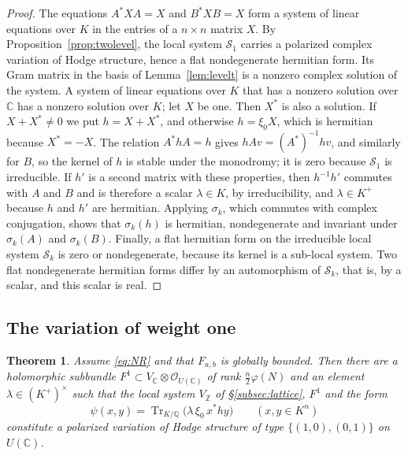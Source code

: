 \documentclass[11pt]{amsart}
\newtheorem{theorem}{Theorem}[section]
\theoremstyle{definition}
\theoremstyle{remark}
\numberwithin{equation}{section}
\newcommand{\Q}{\mathbb{Q}}
\newcommand{\Z}{\mathbb{Z}}
\newcommand{\C}{\mathbb{C}}
\newcommand{\cS}{\mathcal{S}}
\newcommand{\cO}{\mathcal{O}}
\DeclareMathOperator{\Tr}{Tr}
\newcommand{\Fab}{F_{a,b}}
\begin{document}
\begin{proof}
The equations $A^*XA=X$ and $B^*XB=X$ form a system of linear equations over $K$ in the entries of a $n\times n$ matrix $X$. By Proposition~\ref{prop:twolevel}, the local system $\cS_1$ carries a polarized complex variation of Hodge structure, hence a flat nondegenerate hermitian form. Its Gram matrix in the basis of Lemma~\ref{lem:levelt} is a nonzero complex solution of the system. A system of linear equations over $K$ that has a nonzero solution over $\C$ has a nonzero solution over $K$; let $X$ be one. Then $X^*$ is also a solution. If $X+X^*\ne0$ we put $h=X+X^*$, and otherwise $h=\xi_0X$, which is hermitian because $X^*=-X$. The relation $A^*hA=h$ gives $hAv=(A^*)^{-1}hv$, and similarly for $B$, so the kernel of $h$ is stable under the monodromy; it is zero because $\cS_1$ is irreducible. If $h'$ is a second matrix with these properties, then $h^{-1}h'$ commutes with $A$ and $B$ and is therefore a scalar $\lambda\in K$, by irreducibility, and $\lambda\in K^+$ because $h$ and $h'$ are hermitian. Applying $\sigma_k$, which commutes with complex conjugation, shows that $\sigma_k(h)$ is hermitian, nondegenerate and invariant under $\sigma_k(A)$ and $\sigma_k(B)$. Finally, a flat hermitian form on the irreducible local system $\cS_k$ is zero or nondegenerate, because its kernel is a sub-local system. Two flat nondegenerate hermitian forms differ by an automorphism of $\cS_k$, that is, by a scalar, and this scalar is real.
\end{proof}

\subsection{The variation of weight one}
\begin{theorem}\label{thm:wt1}
Assume \eqref{eq:NR} and that $\Fab$ is globally bounded. Then there are a holomorphic subbundle $F^1\subset V_\C\otimes\cO_{U(\C)}$ of rank $\frac n2\varphi(N)$ and an element $\lambda\in(K^+)^\times$ such that the local system $V_\Z$ of \S\ref{subsec:lattice}, $F^1$ and the form
\[
\psi(x,y)=\Tr_{K/\Q}\big(\lambda\,\xi_0\,x^*hy\big)\qquad(x,y\in K^n)
\]
constitute a polarized variation of Hodge structure of type $\{(1,0),(0,1)\}$ on $U(\C)$.
\end{theorem}
\end{document}
